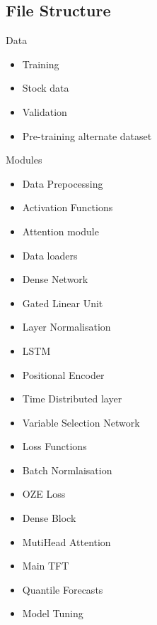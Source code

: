 \documentclass{article}
\begin{document}
\subsection{File Structure}
Data
\begin{itemize}
\item Training
\item Stock data
\item Validation
\item Pre-training alternate dataset
\end{itemize}
Modules
\begin{itemize}
\item Data Prepocessing
\item Activation Functions
\item Attention module
\item Data loaders
\item Dense Network
\item Gated Linear Unit
\item Layer Normalisation
\item LSTM
\item Positional Encoder
\item Time Distributed layer
\item Variable Selection Network
\item Loss Functions
\item Batch Normlaisation
\item OZE Loss
\item Dense Block
\item MutiHead Attention
\item Main TFT
\item Quantile Forecasts
\item Model Tuning
\end{itemize}



\clearpage
\end{document}
